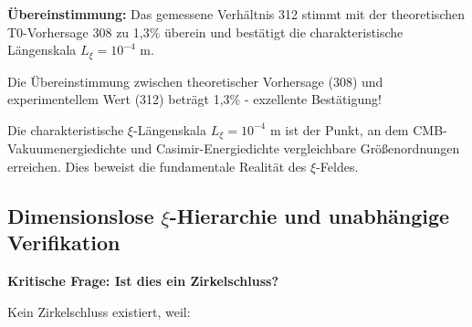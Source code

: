 \documentclass[12pt,a4paper]{article}
\theoremstyle{definition}
\theoremstyle{remark}
\begin{document}
	\textbf{\"Ubereinstimmung:} Das gemessene Verh\"altnis 312 stimmt mit der theoretischen T0-Vorhersage 308 zu 1,3\% \"uberein und best\"atigt die charakteristische L\"angenskala $L_\xi = 10^{-4}$ m.
	
	Die \"Ubereinstimmung zwischen theoretischer Vorhersage (308) und experimentellem Wert (312) betr\"agt 1,3\% - exzellente Best\"atigung!
	
	\begin{important}
		Die charakteristische $\xi$-L\"angenskala $L_\xi = 10^{-4}$ m ist der Punkt, an dem CMB-Vakuumenergiedichte und Casimir-Energiedichte vergleichbare Gr\"o\ss{}enordnungen erreichen. Dies beweist die fundamentale Realit\"at des $\xi$-Feldes.
	\end{important}
	
	\subsection{Dimensionslose $\xi$-Hierarchie und unabh\"angige Verifikation}
	
	\textbf{Kritische Frage: Ist dies ein Zirkelschluss?}
	
	Kein Zirkelschluss existiert, weil:
	
\end{document}
